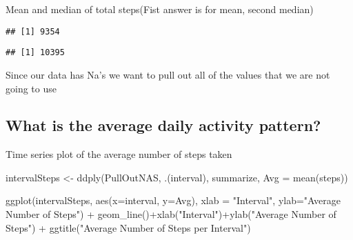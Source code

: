 \documentclass[
]{article}
\newenvironment{Shaded}{\begin{snugshade}}{\end{snugshade}}
\newcommand{\AttributeTok}[1]{\textcolor[rgb]{0.77,0.63,0.00}{#1}}
\newcommand{\FunctionTok}[1]{\textcolor[rgb]{0.00,0.00,0.00}{#1}}
\newcommand{\NormalTok}[1]{#1}
\newcommand{\OtherTok}[1]{\textcolor[rgb]{0.56,0.35,0.01}{#1}}
\newcommand{\SpecialCharTok}[1]{\textcolor[rgb]{0.00,0.00,0.00}{#1}}
\newcommand{\StringTok}[1]{\textcolor[rgb]{0.31,0.60,0.02}{#1}}
\begin{document}
Mean and median of total steps(Fist answer is for mean, second median)

\begin{Shaded}
\end{Shaded}

\begin{verbatim}
## [1] 9354
\end{verbatim}

\begin{Shaded}
\end{Shaded}

\begin{verbatim}
## [1] 10395
\end{verbatim}

Since our data has Na's we want to pull out all of the values that we
are not going to use

\begin{Shaded}
\end{Shaded}

\hypertarget{what-is-the-average-daily-activity-pattern}{%
\subsection{What is the average daily activity
pattern?}\label{what-is-the-average-daily-activity-pattern}}

Time series plot of the average number of steps taken

\begin{Shaded}
\begin{Highlighting}[]
\NormalTok{intervalSteps }\OtherTok{\textless{}{-}} \FunctionTok{ddply}\NormalTok{(PullOutNAS, .(interval), summarize, }\AttributeTok{Avg =} \FunctionTok{mean}\NormalTok{(steps))}

\FunctionTok{ggplot}\NormalTok{(intervalSteps, }\FunctionTok{aes}\NormalTok{(}\AttributeTok{x=}\NormalTok{interval, }\AttributeTok{y=}\NormalTok{Avg), }\AttributeTok{xlab =} \StringTok{"Interval"}\NormalTok{, }\AttributeTok{ylab=}\StringTok{"Average Number of Steps"}\NormalTok{) }\SpecialCharTok{+} \FunctionTok{geom\_line}\NormalTok{()}\SpecialCharTok{+}\FunctionTok{xlab}\NormalTok{(}\StringTok{"Interval"}\NormalTok{)}\SpecialCharTok{+}\FunctionTok{ylab}\NormalTok{(}\StringTok{"Average Number of Steps"}\NormalTok{) }\SpecialCharTok{+} \FunctionTok{ggtitle}\NormalTok{(}\StringTok{"Average Number of Steps per Interval"}\NormalTok{)}
\end{Highlighting}
\end{Shaded}
\end{document}
